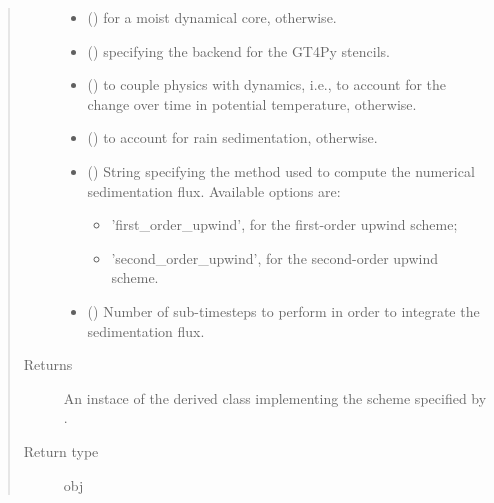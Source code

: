 \documentclass[letterpaper,10pt,english]{sphinxmanual}
\begin{document}
\begin{fulllineitems}
\begin{fulllineitems}
\begin{quote}
\begin{description}
\begin{itemize}
\item {} 
 () \textendash{}  for a moist dynamical core,  otherwise.

\item {} 
 () \textendash{}  specifying the backend for the GT4Py stencils.

\item {} 
 () \textendash{}  to couple physics with dynamics, i.e., to account for the change over time in potential temperature,
 otherwise.

\item {} 
 () \textendash{}  to account for rain sedimentation,  otherwise.

\item {} 
 () \textendash{} 
String specifying the method used to compute the numerical sedimentation flux. Available options are:
\begin{itemize}
\item {} 
’first\_order\_upwind’, for the first-order upwind scheme;

\item {} 
’second\_order\_upwind’, for the second-order upwind scheme.

\end{itemize}


\item {} 
 () \textendash{} Number of sub-timesteps to perform in order to integrate the sedimentation flux.

\end{itemize}

\item[{Returns}] \leavevmode
An instace of the derived class implementing the scheme specified by .

\item[{Return type}] \leavevmode
obj

\end{description}\end{quote}


\end{fulllineitems}
\end{fulllineitems}
\end{document}
